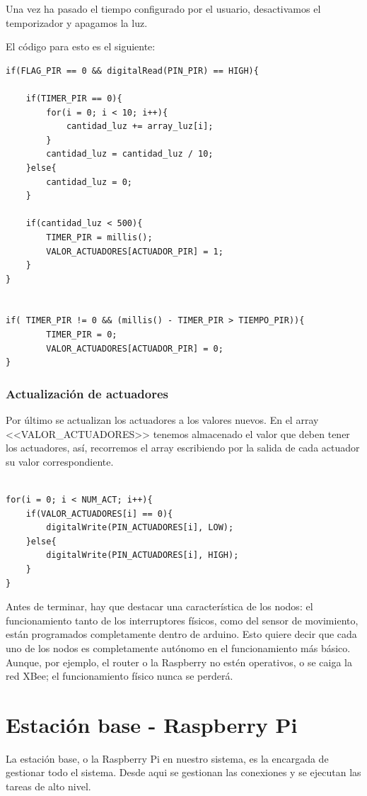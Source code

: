 Una vez ha pasado el tiempo configurado por el usuario, desactivamos el temporizador y apagamos la luz.

El código para esto es el siguiente:

\begin{lstlisting}
if(FLAG_PIR == 0 && digitalRead(PIN_PIR) == HIGH){

    if(TIMER_PIR == 0){
        for(i = 0; i < 10; i++){
            cantidad_luz += array_luz[i];
        }
        cantidad_luz = cantidad_luz / 10;
    }else{
        cantidad_luz = 0;
    }

    if(cantidad_luz < 500){
        TIMER_PIR = millis();
        VALOR_ACTUADORES[ACTUADOR_PIR] = 1;
    }
}


if( TIMER_PIR != 0 && (millis() - TIMER_PIR > TIEMPO_PIR)){
        TIMER_PIR = 0;
        VALOR_ACTUADORES[ACTUADOR_PIR] = 0;
}
\end{lstlisting}


\subsubsection{Actualización de actuadores}
Por último se actualizan los actuadores a los valores nuevos. En el array <<VALOR\_ACTUADORES>> tenemos almacenado el valor que deben tener los actuadores, así, recorremos el array escribiendo por la salida de cada actuador su valor correspondiente. 




\begin{lstlisting}

for(i = 0; i < NUM_ACT; i++){
    if(VALOR_ACTUADORES[i] == 0){
        digitalWrite(PIN_ACTUADORES[i], LOW);
    }else{
        digitalWrite(PIN_ACTUADORES[i], HIGH);
    }
}

\end{lstlisting}

Antes de terminar, hay que destacar una característica de los nodos: el funcionamiento tanto de los interruptores físicos, como del sensor de movimiento, están programados completamente dentro de arduino. Esto quiere decir que cada uno de los nodos es completamente autónomo en el funcionamiento más básico. Aunque, por ejemplo, el router o la Raspberry no estén operativos, o se caiga la red XBee; el funcionamiento físico nunca se perderá.

\section{Estación base - Raspberry Pi}
La estación base, o la Raspberry Pi en nuestro sistema, es la encargada de gestionar todo el sistema. Desde aqui se gestionan las conexiones y se ejecutan las tareas de alto nivel.

